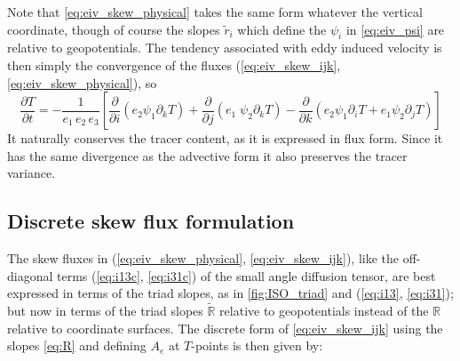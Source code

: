 \documentclass[../main/NEMO_manual]{subfiles}
\begin{document}
Note that \autoref{eq:eiv_skew_physical} takes the same form whatever the vertical coordinate,
though of course the slopes $\tilde{r}_i$ which define the $\psi_i$ in \autoref{eq:eiv_psi} are relative to
geopotentials.
The tendency associated with eddy induced velocity is then simply the convergence of the fluxes
(\autoref{eq:eiv_skew_ijk}, \autoref{eq:eiv_skew_physical}), so
\[
  \frac{\partial T}{\partial t}= -\frac{1}{e_1 \, e_2 \, e_3 }      \left[
    \frac{\partial}{\partial i} \left( e_2 \psi_1 \partial_k T\right)
    + \frac{\partial}{\partial j} \left( e_1  \;
      \psi_2 \partial_k T\right)
    -  \frac{\partial}{\partial k} \left( e_{2} \psi_1 \partial_i T
      + e_{1} \psi_2 \partial_j T \right)  \right]
\]
It naturally conserves the tracer content, as it is expressed in flux form.
Since it has the same divergence as the advective form it also preserves the tracer variance.

\subsection{Discrete skew flux formulation}

The skew fluxes in (\autoref{eq:eiv_skew_physical}, \autoref{eq:eiv_skew_ijk}),
like the off-diagonal terms (\autoref{eq:i13c}, \autoref{eq:i31c}) of the small angle diffusion tensor,
are best expressed in terms of the triad slopes, as in \autoref{fig:ISO_triad} and
(\autoref{eq:i13}, \autoref{eq:i31});
but now in terms of the triad slopes $\tilde{\mathbb{R}}$ relative to geopotentials instead of
the $\mathbb{R}$ relative to coordinate surfaces.
The discrete form of \autoref{eq:eiv_skew_ijk} using the slopes \autoref{eq:R} and
defining $A_e$ at $T$-points is then given by:
\end{document}
